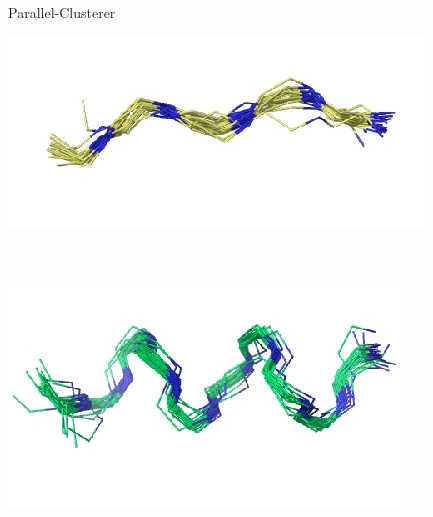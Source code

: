 \begin{subsection}{Parallel-Clusterer}
\begin{frame}
	\begin{minipage}{3cm}
		\includegraphics[scale=0.35]{images/grafico_cluster.jpg}
    \end{minipage}
    \    \ \hfill
	\begin{minipage}{5cm}
	    \includegraphics[scale=0.35]{images/grafico_cluster1.jpg}
	\end{minipage}
\end{frame}
\end{subsection}

